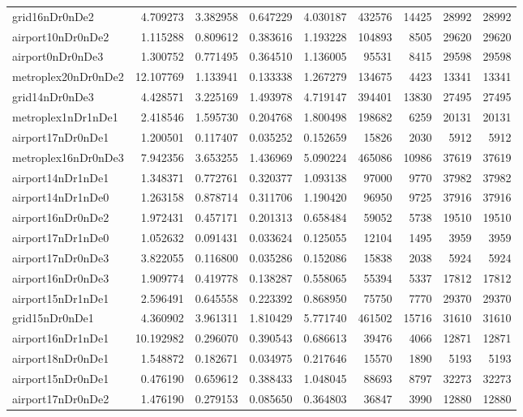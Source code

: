 \begin{longtable}{|l|r|r|r|r|r|r|r|r|}
grid16nDr0nDe2 & 4.709273 & 3.382958 & 0.647229 & 4.030187 & 432576 & 14425 & 28992 & 28992 \\
airport10nDr0nDe2 & 1.115288 & 0.809612 & 0.383616 & 1.193228 & 104893 & 8505 & 29620 & 29620 \\
airport0nDr0nDe3 & 1.300752 & 0.771495 & 0.364510 & 1.136005 & 95531 & 8415 & 29598 & 29598 \\
metroplex20nDr0nDe2 & 12.107769 & 1.133941 & 0.133338 & 1.267279 & 134675 & 4423 & 13341 & 13341 \\
grid14nDr0nDe3 & 4.428571 & 3.225169 & 1.493978 & 4.719147 & 394401 & 13830 & 27495 & 27495 \\
metroplex1nDr1nDe1 & 2.418546 & 1.595730 & 0.204768 & 1.800498 & 198682 & 6259 & 20131 & 20131 \\
airport17nDr0nDe1 & 1.200501 & 0.117407 & 0.035252 & 0.152659 & 15826 & 2030 & 5912 & 5912 \\
metroplex16nDr0nDe3 & 7.942356 & 3.653255 & 1.436969 & 5.090224 & 465086 & 10986 & 37619 & 37619 \\
airport14nDr1nDe1 & 1.348371 & 0.772761 & 0.320377 & 1.093138 & 97000 & 9770 & 37982 & 37982 \\
airport14nDr1nDe0 & 1.263158 & 0.878714 & 0.311706 & 1.190420 & 96950 & 9725 & 37916 & 37916 \\
airport16nDr0nDe2 & 1.972431 & 0.457171 & 0.201313 & 0.658484 & 59052 & 5738 & 19510 & 19510 \\
airport17nDr1nDe0 & 1.052632 & 0.091431 & 0.033624 & 0.125055 & 12104 & 1495 & 3959 & 3959 \\
airport17nDr0nDe3 & 3.822055 & 0.116800 & 0.035286 & 0.152086 & 15838 & 2038 & 5924 & 5924 \\
airport16nDr0nDe3 & 1.909774 & 0.419778 & 0.138287 & 0.558065 & 55394 & 5337 & 17812 & 17812 \\
airport15nDr1nDe1 & 2.596491 & 0.645558 & 0.223392 & 0.868950 & 75750 & 7770 & 29370 & 29370 \\
grid15nDr0nDe1 & 4.360902 & 3.961311 & 1.810429 & 5.771740 & 461502 & 15716 & 31610 & 31610 \\
airport16nDr1nDe1 & 10.192982 & 0.296070 & 0.390543 & 0.686613 & 39476 & 4066 & 12871 & 12871 \\
airport18nDr0nDe1 & 1.548872 & 0.182671 & 0.034975 & 0.217646 & 15570 & 1890 & 5193 & 5193 \\
airport15nDr0nDe1 & 0.476190 & 0.659612 & 0.388433 & 1.048045 & 88693 & 8797 & 32273 & 32273 \\
airport17nDr0nDe2 & 1.476190 & 0.279153 & 0.085650 & 0.364803 & 36847 & 3990 & 12880 & 12880 \\

\end{longtable}

